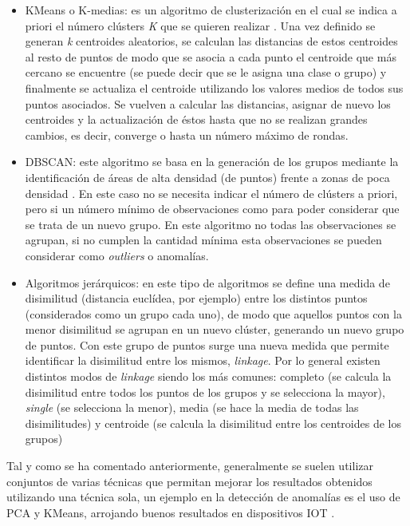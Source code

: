 \begin{itemize}
    \item KMeans o K-medias: es un algoritmo de clusterización en el cual se indica a priori el número clústers \textit{K} que se quieren realizar \cite{james2013introduction}. Una vez definido se generan \textit{k} centroides aleatorios, se calculan las distancias de estos centroides al resto de puntos de modo que se asocia a cada punto el centroide que más cercano se encuentre (se puede decir que se le asigna una clase o grupo) y finalmente se actualiza el centroide utilizando los valores medios de todos sus puntos asociados. Se vuelven a calcular las distancias, asignar de nuevo los centroides y la actualización de éstos hasta que no se realizan grandes cambios, es decir, converge o hasta un número máximo de rondas.
    \item DBSCAN: este algoritmo se basa en la generación de los grupos mediante la identificación de áreas de alta densidad (de puntos) frente a zonas de poca densidad \cite{ester1996density}. En este caso no se necesita indicar el número de clústers a  priori, pero si un número mínimo de observaciones como para poder considerar que se trata de un nuevo grupo. En este algoritmo no todas las observaciones se agrupan, si no cumplen la cantidad mínima esta observaciones se pueden considerar como \textit{outliers} o anomalías.
    \item Algoritmos jerárquicos: en este tipo de algoritmos se define una medida de disimilitud (distancia euclídea, por ejemplo) entre los distintos puntos (considerados como un grupo cada uno), de modo que aquellos puntos con la menor disimilitud se agrupan en un nuevo clúster, generando un nuevo grupo de puntos. Con este grupo de puntos surge una nueva medida que permite identificar la disimilitud entre los mismos, \textit{linkage}. Por lo general existen distintos modos de \textit{linkage} siendo los más comunes: completo (se calcula la disimilitud entre todos los puntos de los grupos y se selecciona la mayor), \textit{single} (se selecciona la menor), media (se hace la media de todas las disimilitudes) y centroide (se calcula la disimilitud entre los centroides de los grupos)
\end{itemize}

Tal y como se ha comentado anteriormente, generalmente se suelen utilizar conjuntos de varias técnicas que permitan mejorar los resultados obtenidos utilizando una técnica sola, un ejemplo en la detección de anomalías es el uso de PCA y KMeans, arrojando buenos resultados en dispositivos IOT \cite{pcakmeans}. 

